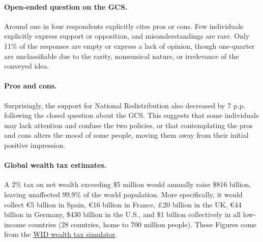 \begin{small}
\paragraph{\small Open-ended question on the GCS.}
Around one in four respondents explicitly cites pros or cons. Few individuals explicitly express support or opposition, and misunderstandings are rare. Only 11\% of the responses are empty or express a lack of opinion, though one-quarter are unclassifiable due to the rarity, nonsensical nature, or irrelevance of the conveyed idea.

\paragraph{\small Pros and cons.}
Surprisingly, the support for National Redistribution also decreased by 7 p.p. following the closed question about the GCS. This suggests that some individuals may lack attention and confuse the two policies, or that contemplating the pros and cons alters the mood of some people, moving them away from their initial positive impression.

\paragraph{\small Global wealth tax estimates.}
A 2\% tax on net wealth exceeding \$5 million would annually raise \$816 billion, leaving unaffected 99.9\% of the world population. More specifically, it would collect \euro{}5 billion in Spain, \euro{}16 billion in France, £20 billion in the UK, \euro{}44 billion in Germany, \$430 billion in the U.S., and \$1 billion collectively in all low-income countries (28 countries, home to 700 million people). These Figures come from the \href{https://wid.world/world-wealth-tax-simulator/}{WID wealth tax simulator}.\cite{chancel_world_2022}



\end{small}
